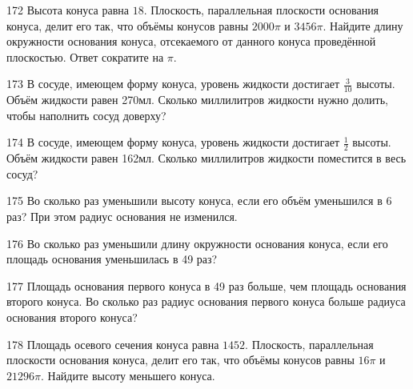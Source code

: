 \documentclass[a4paper]{article}
\begin{document}
\begin{taskBN}{172}
Высота конуса равна $18$. Плоскость, параллельная плоскости основания конуса,  делит его так, что объёмы конусов равны $2000\pi$ и $3456\pi$. Найдите длину окружности основания конуса, отсекаемого от данного конуса проведённой плоскостью. Ответ сократите на $\pi$.
\end{taskBN}

\begin{taskBN}{173}
В сосуде, имеющем форму конуса, уровень жидкости достигает $\frac{3}{10}$ высоты. Объём жидкости равен 270мл. Сколько миллилитров жидкости нужно долить, чтобы наполнить сосуд доверху?
\end{taskBN}

\begin{taskBN}{174}
В сосуде, имеющем форму конуса, уровень жидкости достигает $\frac{1}{2}$ высоты. Объём жидкости равен 162мл. Сколько миллилитров жидкости поместится в весь сосуд?
\end{taskBN}

\begin{taskBN}{175}
Во сколько раз уменьшили высоту конуса, если его объём уменьшился в 6 раз? При этом радиус основания не изменился.
\end{taskBN}

\begin{taskBN}{176}
Во сколько раз уменьшили длину окружности основания конуса, если его площадь основания уменьшилась в 49 раз?
\end{taskBN}

\begin{taskBN}{177}
Площадь основания первого конуса в 49 раз больше, чем площадь основания второго конуса. Во сколько раз радиус основания первого конуса больше радиуса основания второго конуса?
\end{taskBN}

\begin{taskBN}{178}
Площадь осевого сечения конуса равна $1452$. Плоскость, параллельная плоскости основания конуса,  делит его так, что объёмы конусов равны $16\pi$ и $21296\pi$. Найдите высоту меньшего конуса. 
\end{taskBN}
\end{document}
